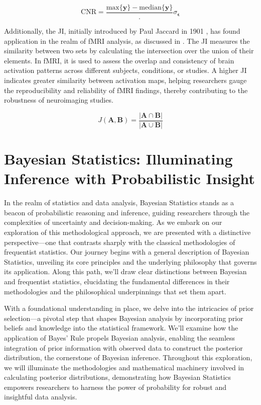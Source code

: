 \begin{equation}
\text{CNR} = \frac{\text{max}\{\bm{y}\}-\text{median}\{\bm{y}\}}.{\sigma_{\bm{\epsilon}}}
\label{eq:CNRDef}
\end{equation}

Additionally, the JI, initially introduced by Paul Jaccard in 1901 \cite{jaccard1901etude}, has found application in the realm of fMRI analysis, as discussed in \cite{maitra2010re}. The JI measures the similarity between two sets by calculating the intersection over the union of their elements. In fMRI, it is used to assess the overlap and consistency of brain activation patterns across different subjects, conditions, or studies. A higher JI indicates greater similarity between activation maps, helping researchers gauge the reproducibility and reliability of fMRI findings, thereby contributing to the robustness of neuroimaging studies.

\begin{equation}
J(\bm{A},\bm{B}) = \frac{|\bm{A} \cap \bm{B}|}{|\bm{A} \cup \bm{B}|}
\label{eq:JIDef}
\end{equation}

\section{Bayesian Statistics: Illuminating Inference with Probabilistic Insight}

In the realm of statistics and data analysis, Bayesian Statistics stands as a beacon of probabilistic reasoning and inference, guiding researchers through the complexities of uncertainty and decision-making. As we embark on our exploration of this methodological approach, we are presented with a distinctive perspective—one that contrasts sharply with the classical methodologies of frequentist statistics. Our journey begins with a general description of Bayesian Statistics, unveiling its core principles and the underlying philosophy that governs its application. Along this path, we'll draw clear distinctions between Bayesian and frequentist statistics, elucidating the fundamental differences in their methodologies and the philosophical underpinnings that set them apart.

With a foundational understanding in place, we delve into the intricacies of prior selection—a pivotal step that shapes Bayesian analysis by incorporating prior beliefs and knowledge into the statistical framework. We'll examine how the application of Bayes' Rule propels Bayesian analysis, enabling the seamless integration of prior information with observed data to construct the posterior distribution, the cornerstone of Bayesian inference. Throughout this exploration, we will illuminate the methodologies and mathematical machinery involved in calculating posterior distributions, demonstrating how Bayesian Statistics empowers researchers to harness the power of probability for robust and insightful data analysis.

